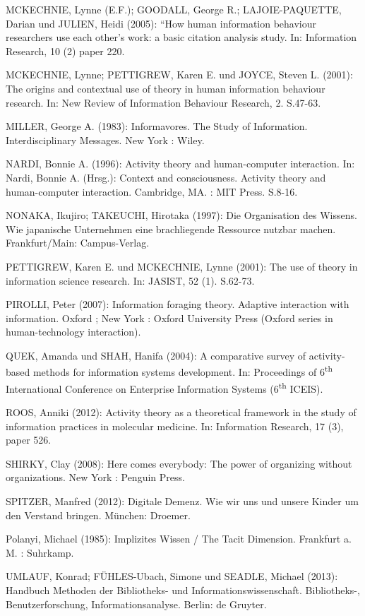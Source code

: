 \documentclass[a4paper,
fontsize=11pt,
oneside,
numbers=noperiodatend,
parskip=half-,
bibliography=totoc,
final
]{scrartcl}
\begin{document}
MCKECHNIE, Lynne (E.F.); GOODALL, George R.; LAJOIE-PAQUETTE, Darian und
JULIEN, Heidi (2005): ``How human information behaviour researchers use
each other's work: a basic citation analysis study. In: Information
Research, 10 (2) paper 220.

MCKECHNIE, Lynne; PETTIGREW, Karen E. und JOYCE, Steven L. (2001): The
origins and contextual use of theory in human information behaviour
research. In: New Review of Information Behaviour Research, 2. S.47-63.

MILLER, George A. (1983): Informavores. The Study of Information.
Interdisciplinary Messages. New York : Wiley.

NARDI, Bonnie A. (1996): Activity theory and human-computer interaction.
In: Nardi, Bonnie A. (Hrsg.): Context and consciousness. Activity theory
and human-computer interaction. Cambridge, MA. : MIT Press. S.8-16.

NONAKA, Ikujiro; TAKEUCHI, Hirotaka (1997): Die Organisation des
Wissens. Wie japanische Unternehmen eine brachliegende Ressource nutzbar
machen. Frankfurt/Main: Campus-Verlag.

PETTIGREW, Karen E. und MCKECHNIE, Lynne (2001): The use of theory in
information science research. In: JASIST, 52 (1). S.62-73.

PIROLLI, Peter (2007): Information foraging theory. Adaptive interaction
with information. Oxford ; New York : Oxford University Press (Oxford
series in human-technology interaction).

QUEK, Amanda und SHAH, Hanifa (2004): A comparative survey of
activity-based methods for information systems development. In:
Proceedings of 6\textsuperscript{th} International Conference on
Enterprise Information Systems (6\textsuperscript{th} ICEIS).

ROOS, Anniki (2012): Activity theory as a theoretical framework in the
study of information practices in molecular medicine. In: Information
Research, 17 (3), paper 526.

SHIRKY, Clay (2008): Here comes everybody: The power of organizing
without organizations. New York : Penguin Press.

SPITZER, Manfred (2012): Digitale Demenz. Wie wir uns und unsere Kinder
um den Verstand bringen. München: Droemer.

Polanyi, Michael (1985): Implizites Wissen / The Tacit Dimension.
Frankfurt a. M. : Suhrkamp.

UMLAUF, Konrad; FÜHLES-Ubach, Simone und SEADLE, Michael (2013):
Handbuch Methoden der Bibliotheks- und Informationswissenschaft.
Bibliotheks-, Benutzerforschung, Informationsanalyse. Berlin: de
Gruyter.
\end{document}
